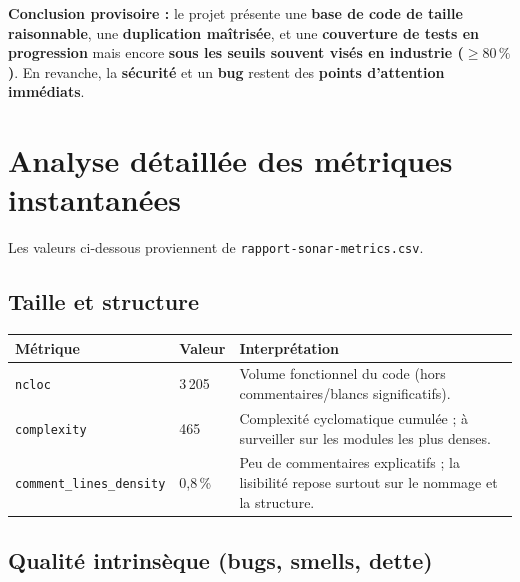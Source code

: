 \documentclass[11pt,a4paper]{article}
\begin{document}
\textbf{Conclusion provisoire :} le projet présente une \textbf{base de code de taille raisonnable}, une \textbf{duplication maîtrisée}, et une \textbf{couverture de tests en progression} mais encore \textbf{sous les seuils souvent visés en industrie ($\geq 80\,\%$)}. En revanche, la \textbf{sécurité} et un \textbf{bug} restent des \textbf{points d'attention immédiats}.

\section{Analyse détaillée des métriques instantanées}

Les valeurs ci-dessous proviennent de \texttt{rapport-sonar-metrics.csv}.

\subsection{Taille et structure}

\begin{table}[h]
  \centering
  \begin{tabular}{@{}llp{7cm}@{}}
    \toprule
    \textbf{Métrique} & \textbf{Valeur} & \textbf{Interprétation} \\
    \midrule
    \texttt{ncloc} & 3\,205 & Volume fonctionnel du code (hors commentaires/blancs significatifs). \\
    \texttt{complexity} & 465 & Complexité cyclomatique cumulée ; à surveiller sur les modules les plus denses. \\
    \texttt{comment\_lines\_density} & 0,8\,\% & Peu de commentaires explicatifs ; la lisibilité repose surtout sur le nommage et la structure. \\
    \bottomrule
  \end{tabular}
\end{table}

\subsection{Qualité intrinsèque (bugs, smells, dette)}
\end{document}
